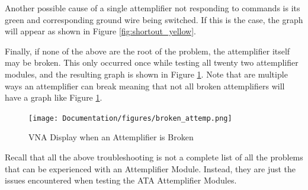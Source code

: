 \documentclass[12pt,a4paper,oneside]{article}
\begin{document}
 Another possible cause of a single attemplifier not responding to commands is its green and corresponding ground wire being switched. If this is the case, the graph will appear as shown in Figure \ref{fig:shortout_yellow}.
 
 Finally, if none of the above are the root of the problem, the attemplifier itself may be broken. This only occurred once while testing all twenty two attemplifier modules, and the resulting graph is shown in Figure \ref{fig:broken_attemplifier}. Note that are multiple ways an attemplifier can break meaning that not all broken attemplifiers will have a graph like Figure \ref{fig:broken_attemplifier}. 
 
 \begin{figure}[H]
 \centering
 \texttt{[image: Documentation/figures/broken\_attemp.png]}
 \caption{VNA Display when an Attemplifier is Broken}
 \label{fig:broken_attemplifier}
 \end{figure}
 
 Recall that all the above troubleshooting is not a complete list of all the problems that can be experienced with an Attemplifier Module. Instead, they are just the issues encountered when testing the ATA Attemplifier Modules.
 
 \newpage
 

\appendix






\end{document}

